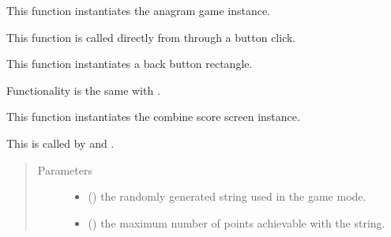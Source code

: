 \documentclass[letterpaper,10pt,english,openany,oneside]{sphinxmanual}
\begin{document}

\begin{fulllineitems}
\label{\detokenize{index:interface.anagram_screen}}
This function instantiates the anagram game instance.

This function is called directly from  through a button click.

\end{fulllineitems}


\begin{fulllineitems}
\label{\detokenize{index:interface.back_button}}
This function instantiates a back button rectangle.

Functionality is the same with .

\end{fulllineitems}


\begin{fulllineitems}
\label{\detokenize{index:interface.combine_score_screen}}
This function instantiates the combine score screen instance.

This is called by  and .
\begin{quote}\begin{description}
\item[{Parameters}] \leavevmode\begin{itemize}
\item {} 
 () \textendash{} the randomly generated string used in the game mode.

\item {} 
 () \textendash{} the maximum number of points achievable with the string.

\end{itemize}

\end{description}\end{quote}

\end{fulllineitems}
\end{document}
